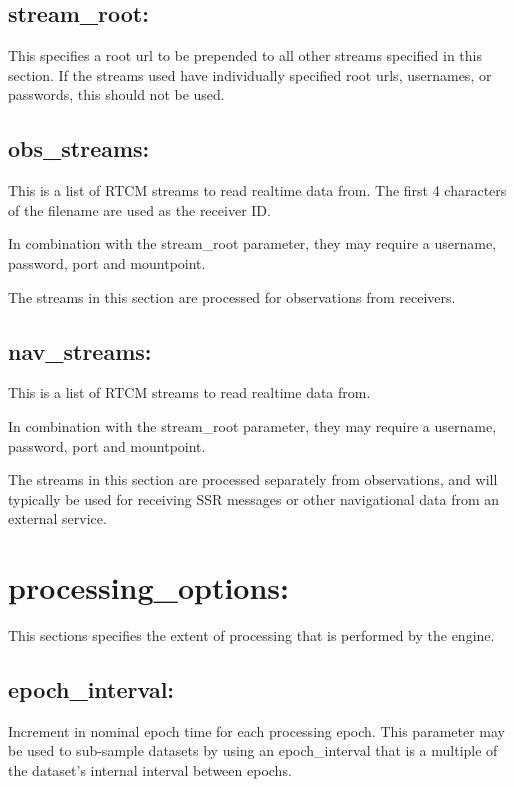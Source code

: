 \subsection{stream\_root:}
This specifies a root url to be prepended to all other streams specified in this section. If the streams used have individually specified root urls, usernames, or passwords, this should not be used.

\subsection{obs\_streams:}
This is a list of RTCM streams to read realtime data from. The first 4 characters of the filename are used as the receiver ID.

In combination with the stream\_root parameter, they may require a username, password, port and mountpoint.

The streams in this section are processed for observations from receivers.

\subsection{nav\_streams:}
This is a list of RTCM streams to read realtime data from. 

In combination with the stream\_root parameter, they may require a username, password, port and mountpoint.

The streams in this section are processed separately from observations, and will typically be used for receiving SSR messages or other navigational data from an external service.
















\section{processing\_options:}

This sections specifies the extent of processing that is performed by the engine.

\subsection{epoch\_interval:}
Increment in nominal epoch time for each processing epoch. This parameter may be used to sub-sample datasets by using an epoch\_interval that is a multiple of the dataset's internal interval between epochs.

